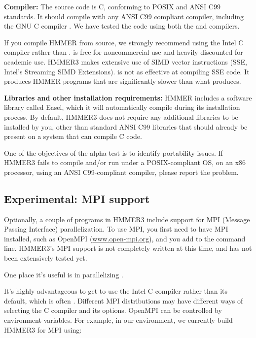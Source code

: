 \textbf{Compiler:} The source code is C, conforming to POSIX and ANSI
C99 standards. It should compile with any ANSI C99 compliant compiler,
including the GNU C compiler . We have tested the code
using both the  and  compilers.

If you compile HMMER from source, we strongly recommend using the
Intel C compiler  rather than .  is free
for noncommercial use and heavily discounted for academic use.  HMMER3
makes extensive use of SIMD vector instructions (SSE, Intel's
Streaming SIMD Extensions).  is not as effective at
compiling SSE code. It produces HMMER programs that are significantly
slower than what  produces.

\textbf{Libraries and other installation requirements:} HMMER includes
a software library called Easel, which it will automatically compile
during its installation process.  By default, HMMER3 does not require
any additional libraries to be installed by you, other than standard
ANSI C99 libraries that should already be present on a system that can
compile C code.

\begin{sidebar}
One of the objectives of the alpha test is to identify portability
issues. If HMMER3 fails to compile and/or run under a POSIX-compliant
OS, on an x86 processor, using an ANSI C99-compliant compiler, please
report the problem.
\end{sidebar}


\subsection{Experimental: MPI support}

Optionally, a couple of programs in HMMER3 include support for MPI
(Message Passing Interface) parallelization. To use MPI, you first
need to have MPI installed, such as OpenMPI (\url{www.open-mpi.org}),
and you add  to the  command
line. HMMER3's MPI support is not completely written at this time, and
has not been extensively tested yet. 

One place it's useful is in parallelizing .

It's highly advantageous to get  to use the Intel C
compiler rather than its default, which is often . Different
MPI distributions may have different ways of selecting the C compiler
and its options. OpenMPI can be controlled by environment variables.
For example, in our environment, we currently build HMMER3 for MPI
using:

